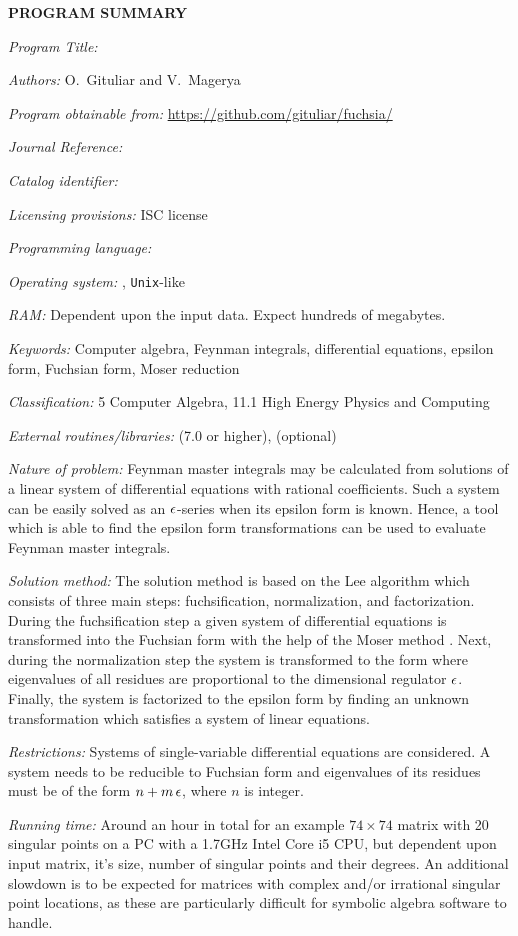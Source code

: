 {\bf PROGRAM SUMMARY}

\begin{small}
\noindent

{\em Program Title:}
    \fuchsia

{\em Authors:}
    O.~Gituliar and V.~Magerya

{\em Program obtainable from:}
    \url{https://github.com/gituliar/fuchsia/}

{\em Journal Reference:}

{\em Catalog identifier:}

{\em Licensing provisions:}
    ISC license

{\em Programming language:}

{\em Operating system:}
    \linux, \texttt{Unix}-like

{\em RAM:}
    Dependent upon the input data. Expect hundreds of megabytes.

{\em Keywords:}
    Computer algebra, Feynman integrals, differential equations, epsilon form, Fuchsian form, Moser reduction

{\em Classification:}
    5 Computer Algebra, 11.1 High Energy Physics and Computing

{\em External routines/libraries:}
    \href{http://www.sagemath.org/}{\sage} (7.0 or higher), \maple (optional)

{\em Nature of problem:}
    Feynman master integrals may be calculated from solutions of a linear system of differential equations with rational coefficients.
    Such a system can be easily solved as an $\epsilon$-series when its epsilon form is known.
    Hence, a tool which is able to find the epsilon form transformations can be used to evaluate Feynman master integrals. 

{\em Solution method:}
    The solution method is based on the Lee algorithm \cite{Lee15} which consists of three main steps: fuchsification, normalization, and factorization.
    During the fuchsification step a given system of differential equations is transformed into the Fuchsian form with the help of the Moser method \cite{Mos59}.
    Next, during the normalization step the system is transformed to the form where eigenvalues of all residues are proportional to the dimensional regulator $\epsilon$.
    Finally, the system is factorized to the epsilon form by finding an unknown transformation which satisfies a system of linear equations.

{\em Restrictions:}
    Systems of single-variable differential equations are considered.
    A system needs to be reducible to Fuchsian form and eigenvalues of its residues must be of the form $n + m\,\epsilon$, where $n$ is integer.

{\em Running time:}
    Around an hour in total for an example $74\times74$ matrix with 20 singular points on a PC with a 1.7GHz Intel Core i5 CPU, but dependent upon input matrix, it's size, number of singular points and their degrees.
    An additional slowdown is to be expected for matrices with complex and/or irrational singular point locations, as these are particularly difficult for symbolic algebra software to handle.

\end{small}
